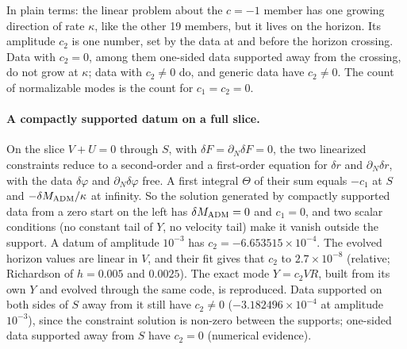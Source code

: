 \documentclass[11pt]{article}
\theoremstyle{plain}
\begin{document}
In plain terms: the linear problem about the $c=-1$ member has one growing direction of rate $\kappa$, like the other 19
members, but it lives on the horizon. Its amplitude $c_2$ is one number, set by the data at and before the horizon crossing.
Data with $c_2=0$, among them one-sided data supported away from the crossing, do not grow at $\kappa$; data with $c_2\ne0$ do, and
generic data have $c_2\ne0$. The count of normalizable modes is the count for $c_1=c_2=0$. 
\paragraph{A compactly supported datum on a full slice.} On the slice $V+U=0$ through $S$, with $\delta F=\partial_N\delta F=0$, the
two linearized constraints reduce to a second-order and a first-order equation for $\delta r$ and $\partial_N\delta r$, with the
data $\delta\varphi$ and $\partial_N\delta\varphi$ free. A first integral $\Theta$ of their sum equals $-c_1$ at $S$ and
$-\delta M_{\rm ADM}/\kappa$ at infinity. So the solution generated by compactly supported data from a zero start on the left has
$\delta M_{\rm ADM}=0$ and $c_1=0$, and two scalar conditions (no constant tail of $Y$, no velocity tail) make it vanish outside
the support. A datum of amplitude $10^{-3}$ has $c_2=-6.653515\times10^{-4}$. The evolved horizon values are linear in $V$, and
their fit gives that $c_2$ to $2.7\times10^{-8}$ (relative; Richardson of $h=0.005$ and $0.0025$). The exact mode $Y=c_2VR$, built
from its own $Y$ and evolved through the same code, is reproduced. Data supported on both sides of $S$ away from it still have
$c_2\ne0$ ($-3.182496\times10^{-4}$ at amplitude $10^{-3}$), since the constraint solution is non-zero between the supports;
one-sided data supported away from $S$ have $c_2=0$ (numerical evidence).
\end{document}
